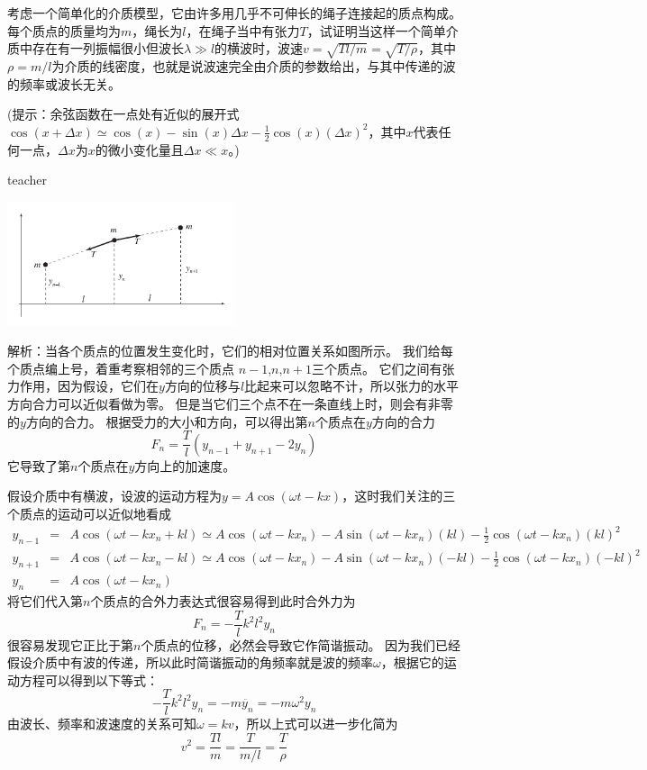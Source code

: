 \begin{example}
考虑一个简单化的介质模型，它由许多用几乎不可伸长的绳子连接起的质点构成。
每个质点的质量均为$m$，绳长为$l$，在绳子当中有张力$T$，试证明当这样一个简单介质中存在有一列振幅很小但波长$\lambda \gg l$的横波时，波速$v=\sqrt{Tl/m} = \sqrt{T/\rho}$，其中$\rho=m/l$为介质的线密度，也就是说波速完全由介质的参数给出，与其中传递的波的频率或波长无关。

(提示：余弦函数在一点处有近似的展开式$\cos(x+\Delta x)\simeq \cos(x)-\sin(x)\Delta x-\frac{1}{2}\cos(x)(\Delta x )^2$，其中$x$代表任何一点，$\Delta x$为$x$的微小变化量且$\Delta x\ll x$。)
\begin{taggedblock}{teacher}
\begin{center}
\includegraphics[width = 0.5\textwidth]{images/ow-solution-4-transverse-waves}
\end{center}
\noindent
解析：当各个质点的位置发生变化时，它们的相对位置关系如图所示。
我们给每个质点编上号，着重考察相邻的三个质点 $n-1$,$n$,$n+1$三个质点。
它们之间有张力作用，因为假设，它们在$y$方向的位移与$l$比起来可以忽略不计，所以张力的水平方向合力可以近似看做为零。
但是当它们三个点不在一条直线上时，则会有非零的$y$方向的合力。
根据受力的大小和方向，可以得出第$n$个质点在$y$方向的合力
\[F_n = \frac{T}{l}(y_{n-1}+y_{n+1}-2y_n)\]
它导致了第$n$个质点在$y$方向上的加速度。

假设介质中有横波，设波的运动方程为$y = A\cos(\omega t-kx)$，这时我们关注的三个质点的运动可以近似地看成
\begin{eqnarray*}
y_{n-1} &=&A\cos(\omega t - kx_n+kl)\simeq A\cos(\omega t - kx_n)-A\sin(\omega t - kx_n)(kl)-\frac{1}{2}\cos(\omega t - kx_n)(kl)^2\\
y_{n+1} &=&A\cos(\omega t - kx_n-kl)\simeq A\cos(\omega t - kx_n)-A\sin(\omega t - kx_n)(-kl)-\frac{1}{2}\cos(\omega t - kx_n)(-kl)^2\\
y_n&=&A\cos(\omega t - kx_n)
\end{eqnarray*}
将它们代入第$n$个质点的合外力表达式很容易得到此时合外力为
\[
F_n =- \frac{T}{l}k^2l^2y_n
\]
很容易发现它正比于第$n$个质点的位移，必然会导致它作简谐振动。
因为我们已经假设介质中有波的传递，所以此时简谐振动的角频率就是波的频率$\omega$，根据它的运动方程可以得到以下等式：
\[
- \frac{T}{l}k^2l^2y_n = -m \ddot{y_n} = -m\omega^2 y_n
\]
由波长、频率和波速度的关系可知$\omega = kv$，所以上式可以进一步化简为
\[
v^2 = \frac{Tl}{m} = \frac{T}{m/l} = \frac{T}{\rho}
\]
\end{taggedblock}
\end{example}


